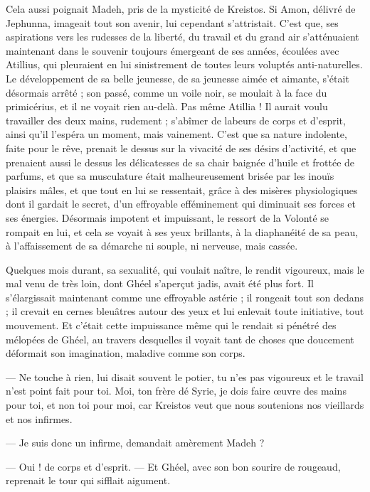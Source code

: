 \documentclass[a4paper, 11pt, oneside, polutonikogreek, french]{article}
\begin{document}
Cela aussi poignait Madeh, pris de la mysticité de Kreistos. Si Amon, délivré de Jephunna, imageait tout son avenir, lui cependant s'attristait. C'est que, ses aspirations vers les rudesses de la liberté, du travail et du grand air s'atténuaient maintenant dans le souvenir toujours émergeant de ses années, écoulées avec Atillius, qui pleuraient en lui sinistrement de toutes leurs voluptés anti-naturelles. Le développement de sa belle jeunesse, de sa jeunesse aimée et aimante, s'était désormais arrêté ; son passé, comme un voile noir, se moulait à la face du primicérius, et il ne voyait rien au-delà. Pas même Atillia ! Il aurait voulu travailler des deux mains, rudement ; s'abîmer de labeurs de corps et d'esprit, ainsi qu'il l'espéra un moment, mais vainement. C'est que sa nature indolente, faite pour le rêve, prenait le dessus sur la vivacité de ses désirs d'activité, et que prenaient aussi le dessus les délicatesses de sa chair baignée d'huile et frottée de parfums, et que sa musculature était malheureusement brisée par les inouïs plaisirs mâles, et que tout en lui se ressentait, grâce à des misères physiologiques dont il gardait le secret, d'un effroyable efféminement qui diminuait ses forces et ses énergies. Désormais impotent et impuissant, le ressort de la Volonté se rompait en lui, et cela se voyait à ses yeux brillants, à la diaphanéité de sa peau, à l'affaissement de sa démarche ni souple, ni nerveuse, mais cassée.

Quelques mois durant, sa sexualité, qui voulait naître, le rendit vigoureux, mais le mal venu de très loin, dont Ghéel s'aperçut jadis, avait été plus fort. Il s'élargissait maintenant comme une effroyable astérie ; il rongeait tout son dedans ; il crevait en cernes bleuâtres autour des yeux et lui enlevait toute initiative, tout mouvement. Et c'était cette impuissance même qui le rendait si pénétré des mélopées de Ghéel, au travers desquelles il voyait tant de choses que doucement déformait son imagination, maladive comme son corps.

--- Ne touche à rien, lui disait souvent le potier, tu n'es pas vigoureux et le travail n'est point fait pour toi. Moi, ton frère dé Syrie, je dois faire œuvre des mains pour toi, et non toi pour moi, car Kreistos veut que nous soutenions nos vieillards et nos infirmes.

--- Je suis donc un infirme, demandait amèrement Madeh ?

--- Oui ! de corps et d'esprit. --- Et Ghéel, avec son bon sourire de rougeaud, reprenait le tour qui sifflait aigument.
\end{document}
